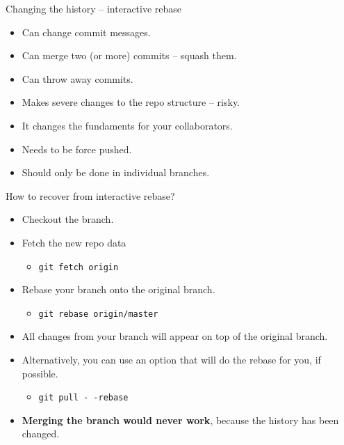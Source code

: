 \documentclass[14pt]{beamer}
\begin{document}
	\begin{frame}{Changing the history -- interactive rebase}
	\begin{itemize}
		\item Can change commit messages.
		\item Can merge two (or more) commits -- squash them.
		\item Can throw away commits.
		\item Makes severe changes to the repo structure -- risky.
		\item It changes the fundaments for your collaborators.
		\item Needs to be force pushed.
		\item Should only be done in individual branches.
	\end{itemize}
\end{frame}

	\begin{frame}{How to recover from interactive rebase?}
	\begin{itemize}
		\item Checkout the branch.
		\item Fetch the new repo data 
		\begin{itemize}
			\item \texttt{git fetch origin}
		\end{itemize}
		\item Rebase your branch onto the original branch.
		\begin{itemize}
			\item \texttt{git rebase origin/master}
		\end{itemize}
		\item All changes from your branch will appear on top of the original branch.
		\item Alternatively, you can use an option that will do the rebase for you, if possible.
		\begin{itemize}
			\item \texttt{git pull -\,-rebase}
		\end{itemize}
		\item \textbf{Merging the branch would never work}, because the history has been changed.
	\end{itemize}
\end{frame}
\end{document}
